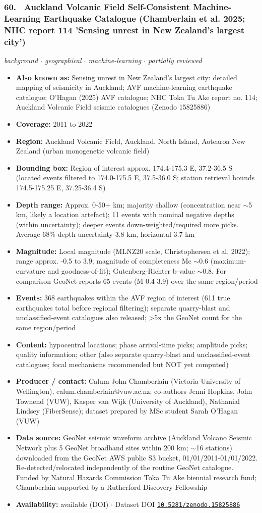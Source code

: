 \documentclass[10pt,a4paper]{article}
\newcommand{\kv}[2]{\item \textbf{#1:} #2}
\begin{document}
\subsubsection*{\hypertarget{c:60}{60.}~ Auckland Volcanic Field Self-Consistent Machine-Learning Earthquake Catalogue (Chamberlain et al. 2025; NHC report 114 'Sensing unrest in New Zealand's largest city')}
{\small\itshape background $\cdot$ geographical $\cdot$ machine-learning $\cdot$ partially reviewed}\par\vspace{2pt}
\begin{itemize}[leftmargin=1.3em,itemsep=0.6pt,topsep=1pt,parsep=0pt]
\kv{Also known as}{Sensing unrest in New Zealand's largest city: detailed mapping of seismicity in Auckland; AVF machine-learning earthquake catalogue; O'Hagan (2025) AVF catalogue; NHC Toka Tu Ake report no. 114; Auckland Volcanic Field seismic catalogues (Zenodo 15825886)}
\kv{Coverage}{2011 to 2022}
\kv{Region}{Auckland Volcanic Field, Auckland, North Island, Aotearoa New Zealand (urban monogenetic volcanic field)}
\kv{Bounding box}{Region of interest approx. 174.4-175.3 E, 37.2-36.5 S (located events filtered to 174.0-175.5 E, 37.5-36.0 S; station retrieval bounds 174.5-175.25 E, 37.25-36.4 S)}
\kv{Depth range}{Approx. 0-50+ km; majority shallow (concentration near $\sim$5 km, likely a location artefact); 11 events with nominal negative depths (within uncertainty); deeper events down-weighted/required more picks. Average 68\% depth uncertainty 3.8 km, horizontal 3.7 km}
\kv{Magnitude}{Local magnitude (MLNZ20 scale, Christophersen et al. 2022); range approx. -0.5 to 3.9; magnitude of completeness Mc $\sim$0.6 (maximum-curvature and goodness-of-fit); Gutenberg-Richter b-value $\sim$0.8. For comparison GeoNet reports 65 events (M 0.4-3.9) over the same region/period}
\kv{Events}{368 earthquakes within the AVF region of interest (611 true earthquakes total before regional filtering); separate quarry-blast and unclassified-event catalogues also released; \textgreater{}5x the GeoNet count for the same region/period}
\kv{Content}{hypocentral locations; phase arrival-time picks; amplitude picks; quality information; other (also separate quarry-blast and unclassified-event catalogues; focal mechanisms recommended but NOT yet computed)}
\kv{Producer / contact}{Calum John Chamberlain (Victoria University of Wellington), calum.chamberlain@\allowbreak{}vuw.ac.nz; co-authors Jenni Hopkins, John Townend (VUW), Kasper van Wijk (University of Auckland), Nathanial Lindsey (FiberSense); dataset prepared by MSc student Sarah O'Hagan (VUW)}
\kv{Data source}{GeoNet seismic waveform archive (Auckland Volcano Seismic Network plus 5 GeoNet broadband sites within 200 km; $\sim$16 stations) downloaded from the GeoNet AWS public S3 bucket, 01/01/2011-01/01/2022. Re-detected/relocated independently of the routine GeoNet catalogue. Funded by Natural Hazards Commission Toka Tu Ake biennial research fund; Chamberlain supported by a Rutherford Discovery Fellowship}
\kv{Availability}{available (DOI) $\cdot$ Dataset DOI \href{https://doi.org/10.5281/zenodo.15825886}{\nolinkurl{10.5281/zenodo.15825886}}}
\end{itemize}
\end{document}

